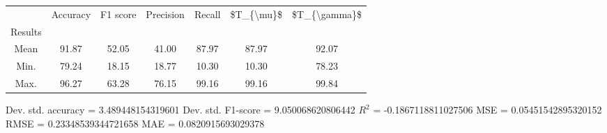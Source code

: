 \begin{tabular}{|c|c|c|c|c|c|c|}
\toprule
{} &  Accuracy &  F1 score &  Precision &  Recall &  \$T\_\{\textbackslash mu\}\$ &  \$T\_\{\textbackslash gamma\}\$ \\
Results &           &           &            &         &            &               \\
\hline
Mean    &     91.87 &     52.05 &      41.00 &   87.97 &      87.97 &         92.07 \\
Min.    &     79.24 &     18.15 &      18.77 &   10.30 &      10.30 &         78.23 \\
Max.    &     96.27 &     63.28 &      76.15 &   99.16 &      99.16 &         99.84 \\
\bottomrule
\end{tabular}

 Dev. std. accuracy = 3.489448154319601
 Dev. std. F1-score = 9.050068620806442
 $R^2$ = -0.1867118811027506
 MSE = 0.05451542895320152
 RMSE = 0.23348539344721658
 MAE = 0.0820915693029378